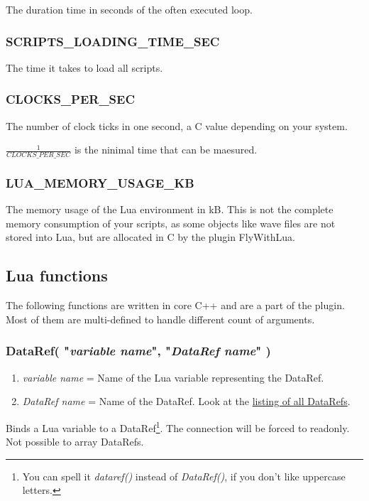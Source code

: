 \documentclass[11pt,parskip=half,a4paper]{scrartcl}
\begin{document}
The duration time in seconds of the often executed loop.

\subsubsection{SCRIPTS\_LOADING\_TIME\_SEC}

The time it takes to load all scripts.

\subsubsection{CLOCKS\_PER\_SEC}

The number of clock ticks in one second, a C value depending on your system.

$\frac{1}{CLOCKS\_PER\_SEC}$ is the ninimal time that can be maesured.

\subsubsection{LUA\_MEMORY\_USAGE\_KB}

The memory usage of the Lua environment in kB. This is not the complete memory consumption of your scripts, as some objects like wave files are not stored into Lua, but are allocated in C by the plugin FlyWithLua.

\newpage
\subsection{Lua functions}

The following functions are written in core C++ and are a part of the plugin. Most of them are multi-defined to handle different count of arguments.

\subsubsection{DataRef( "\emph{variable name}", "\emph{DataRef name}" )}

\begin{enumerate}
	\item \emph{variable name} = Name of the Lua variable representing the DataRef.
	\item \emph{DataRef name} = Name of the DataRef. Look at the \href{http://www.xsquawkbox.net/xpsdk/docs/DataRefs.html}{listing of all DataRefs}.
\end{enumerate}

Binds a Lua variable to a DataRef\footnote{You can spell it \emph{dataref()} instead of \emph{DataRef()}, if you don't like uppercase letters.}. The connection will be forced to readonly. Not possible to array DataRefs.
\end{document}
